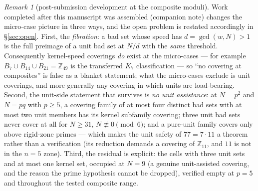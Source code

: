 \documentclass[11pt,a4paper]{article}
\numberwithin{equation}{section}
\theoremstyle{plain}
\theoremstyle{definition}
\theoremstyle{remark}
\newtheorem{remark}[theorem]{Remark}
\newcommand{\Z}{\mathbb{Z}}
\begin{document}
\begin{remark}[post-submission development at the composite moduli]
\label{rem:postcomposite}
Work completed after this manuscript was assembled (companion note) changes
the micro-case picture in three ways, and the open problem is restated
accordingly in \S\ref{sec:open}. First, the \emph{fibration}: a bad set
whose speed has $d=\gcd(w,N)>1$ is the full preimage of a unit bad set at
$N/d$ with the \emph{same} threshold. Consequently kernel-speed coverings
\emph{do} exist at the micro-cases --- for example
$B_7\cup B_{14}\cup B_{21}=\Z_{49}$ is the transferred $K_7$ classification
--- so ``no covering at composites'' is false as a blanket statement; what
the micro-cases exclude is unit coverings, and more generally any covering
in which units are load-bearing. Second, the unit-side statement that
survives is \emph{no unit assistance}: at $N=p^2$ and $N=pq$ with
$p\ge5$, a covering family of at most four distinct bad sets with at most
two unit members has its kernel subfamily covering; three unit bad sets
never cover at all for $N\ge31$, $N\not\equiv0\pmod6$; and a pure-unit
family covers only above rigid-zone primes --- which makes the unit safety
of $77=7\cdot11$ a theorem rather than a verification (its reduction
demands a covering of $\Z_{11}$, and $11$ is not in the $n=5$ zone). Third,
the residual is explicit: the cells with three unit sets and at most one
kernel set, occupied at $N=9$ (a genuine unit-assisted covering, and the
reason the prime hypothesis cannot be dropped), verified empty at $p=5$
and throughout the tested composite range.


\end{remark}
\end{document}
